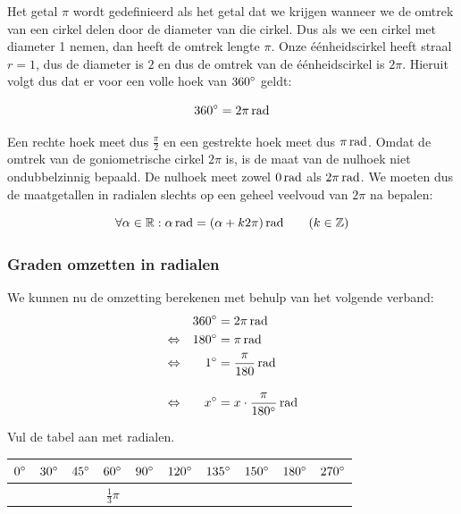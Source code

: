 \documentclass[a4paper,12pt,twoside]{article}
\begin{document}
Het getal $\pi$ wordt gedefinieerd als het getal dat we krijgen wanneer we de omtrek van een cirkel delen door de diameter van die cirkel. Dus als we een cirkel met diameter 1 nemen, dan heeft de omtrek lengte $\pi$. Onze éénheidscirkel heeft straal $r=1$, dus de diameter is $2$ en dus de omtrek van de éénheidscirkel is $2\pi$. Hieruit volgt dus dat er voor een volle hoek van $360^\circ$ geldt:

\begin{mdframed}
$$360\degree = 2\pi \rad$$
\end{mdframed}

Een rechte hoek meet dus $\frac{\pi}{2}$ en een gestrekte hoek meet dus $\pi \rad$. Omdat de omtrek van de goniometrische cirkel $2\pi$ is, is de maat van de nulhoek niet ondubbelzinnig bepaald. De nulhoek meet zowel $0 \rad$ als $2\pi \rad$. We moeten dus de maatgetallen in radialen slechts op een geheel veelvoud van $2\pi$ na bepalen:

\begin{mdframed}
$$\forall \alpha \in \mathbb{R} : \alpha \rad = (\alpha + k2\pi) \rad \qquad (k\in \mathbb{Z})$$
\end{mdframed}

\subsubsection*{Graden omzetten in radialen}
We kunnen nu de omzetting berekenen met behulp van het volgende verband:
\begin{alignat*}{2}
     &&360\degree &= 2\pi \rad\\
\lra &&180\degree &= \pi \rad\\
\lra &&  1\degree &= \frac{\pi}{180} \rad\\[1em]
\lra &&  x\degree &= x\cdot\frac{\pi}{180\degree} \rad
\end{alignat*}

\begin{oefening}
Vul de tabel aan met radialen.
\begin{center}
  \begin{tabular}{c|c|c|c|c|c|c|c|c|c}
    $0^\circ$ & $30^\circ$ & $45^\circ$ & $60^\circ$ &$90^\circ$ &$120^\circ$ &$135^\circ$ &$150^\circ$ &$180^\circ$ & $270^\circ$ \\
    \hline
   &&&$\frac{1}{3}\pi$&&&&&&\\
  \end{tabular}
\end{center}
\end{oefening}
\end{document}
